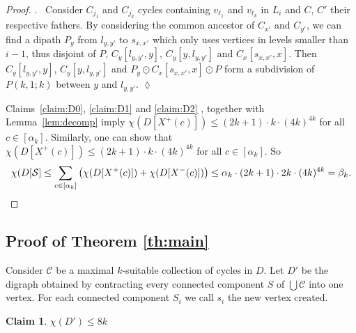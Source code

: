 \documentclass[utf8,10pt]{article}
\theoremstyle{plain}
\newtheorem{claim}{Claim}[theorem]
\theoremstyle{definition}
\theoremstyle{remark}
\newenvironment{subproof}{\par\noindent {\it Subproof}.\ }{\hfill$\lozenge$\par\vspace{11pt}}
\newcommand{\dr}{ (2k+1)\cdot k \cdot (4k)^{4k}}
\begin{document}
\begin{proof}
\begin{subproof}
Consider $C_{j_1}$ and $C_{j_k}$ cycles containing $v_{\ell_1}$ and $v_{\ell_k}$ in $L_i$ and $C$, $C'$ their respective fathers. 
By considering the common ancestor of $C_{x'}$ and $C_{y'}$, we can find a dipath $P_y$ from $l_{y,y'}$ to $s_{x,x'}$ which 
only uses vertices in levels smaller than $i-1$, thus disjoint of $P$, $C_y[l_{y,y'}, y]$, $C_y[y, l_{y,y'}]$ and $C_x[s_{x,x'}, x]$. 
Then $C_y[l_{y,y'}, y]$, $C_y[y, l_{y,y'}]$ and $P_y \odot C_x[s_{x,x'}, x] \odot P$ form a subdivision of $P(k,1;k)$ between $y$ 
and $l_{y,y'}$. 
\end{subproof}




Claims~\ref{claim:D0}, \ref{claim:D1} and  \ref{claim:D2} , together with Lemma~\ref{lem:decomp} imply $\chi(D[X^+(c)]) \leq  \dr$ for all $c\in [\alpha_k]$.
Similarly, one can show that  $\chi(D[X^+(c)]) \leq  \dr$ for all $c\in [\alpha_k]$. So $$\chi(D[{\cal S}]\leq \sum_{c\in [\alpha_k]} \left (\chi(D[X^+(c)]) + \chi(D[X^-(c)]) \right) \leq \alpha_k \cdot (2k+1) \cdot  2k \cdot (4k)^{4k}=\beta_k.$$
\end{proof}





\subsection{Proof of Theorem \ref{th:main}}

Consider $\mathcal{C}$ be a maximal $k$-suitable collection of cycles in $D$. Let $D'$ be the digraph obtained by contracting 
every connected component $S$ of $\bigcup \mathcal{C}$ into one vertex. For each connected component $S_i$ we call $s_i$ the
new vertex created.

\begin{claim}\label{cl:nocycle}
$\chi(D') \leq 8k$
\end{claim} 
\end{document}

